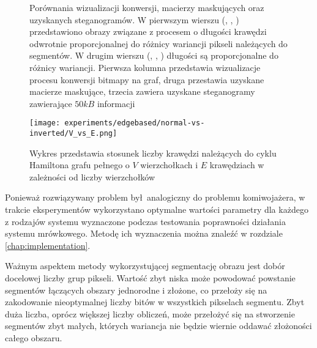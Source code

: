 {{{\begin{figure}
                \caption[Porównania wizualizacji konwersji oraz macierzy maskujących.]
                {Porównania wizualizacji konwersji, macierzy maskujących oraz uzyskanych steganogramów. W pierwszym
                    wierszu (, , )
                    przedstawiono obrazy związane z procesem o długości krawędzi odwrotnie proporcjonalnej do różnicy
                    wariancji pikseli należących do segmentów. W drugim wierszu (,
                    , ) długości są proporcjonalne do
                    różnicy wariancji. Pierwsza kolumna przedstawia wizualizacje procesu konwersji bitmapy na graf,
                    druga przestawia uzyskane macierze maskujące, trzecia zawiera uzyskane steganogramy zawierające
                    $50kB$ informacji}
                \label{fig:exp-edge}
            \end{figure}

            \begin{figure}
                \center
                \texttt{[image: experiments/edgebased/normal-vs-inverted/V\_vs\_E.png]}
                \caption
                {Wykres przedstawia stosunek liczby krawędzi należących do cyklu Hamiltona grafu pełnego o $V$
                    wierzchołkach i $E$ krawędziach w zależności od liczby wierzchołków}
                \label{fig:exp-edge-v-vs-e}
            \end{figure}

            Ponieważ rozwiązywany problem był analogiczny do problemu komiwojażera, w trakcie eksperymentów wykorzystano
            optymalne wartości parametry dla każdego z rodzajów systemu wyznaczone podczas testowania poprawności
            działania systemu mrówkowego. Metodę ich wyznaczenia można znaleźć w rozdziale \ref{chap:implementation}.

            Ważnym aspektem metody wykorzystującej segmentację obrazu jest dobór docelowej liczby grup pikseli. Wartość
            zbyt niska może powodować powstanie segmentów łączących obszary jednorodne i złożone, co przełoży się na
            zakodowanie nieoptymalnej liczby bitów w wszystkich pikselach segmentu. Zbyt duża liczba, oprócz większej
            liczby obliczeń, może przełożyć się na stworzenie segmentów zbyt małych, których wariancja nie
            będzie wiernie oddawać złożoności całego obszaru.

}}}
